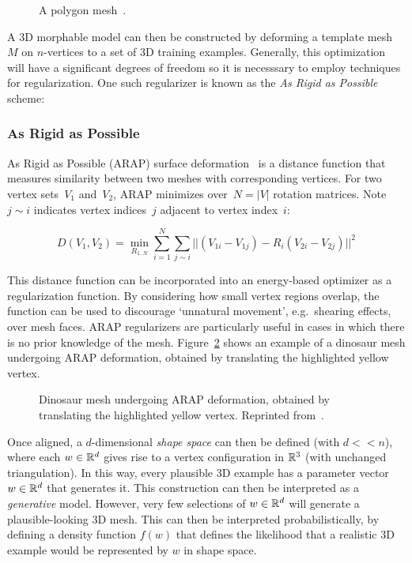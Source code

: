 \begin{figure}[H] %
    \caption{A polygon mesh~\cite{polygon_mesh}.}
    \label{fig:polygon_mesh}
\end{figure}

A 3D morphable model can then be constructed by deforming a template mesh $M$ on $n$-vertices to a set of 3D training examples. Generally, this optimization will have a significant degrees of freedom so it is necesssary to employ techniques for regularization. One such regularizer is known as the \emph{As Rigid as Possible} scheme: 

\subsubsection{As Rigid as Possible}
As Rigid as Possible (ARAP) surface deformation~\cite{sorkine2007rigid} is a distance function that measures similarity between two meshes with corresponding vertices. For two vertex sets~$V_{1}$ and~$V_{2}$, ARAP minimizes over~$N = |V|$ rotation matrices. Note~$j \sim i$ indicates vertex indices~$j$ adjacent to vertex index~$i$:

\begin{equation}
    D(V_{1}, V_{2}) = \min_{R_{1..N}}\sum_{i=1}^{N}\sum_{j \sim i}|| (V_{1i} - V_{1j}) - R_{i}(V_{2i} - V_{2j}) ||^{2}
\end{equation}

This distance function can be incorporated into an energy-based optimizer as a regularization function. By considering how small vertex regions overlap, the function can be used to  discourage `unnatural movement', e.g.\ shearing effects, over mesh faces. ARAP regularizers are particularly useful in cases in which there is no prior knowledge of the mesh. Figure~\ref{fig:arap_dino} shows an example of a dinosaur mesh undergoing ARAP deformation, obtained by translating the highlighted yellow vertex.

\begin{figure}[H] %
    \caption{Dinosaur mesh undergoing ARAP deformation, obtained by translating the highlighted yellow vertex. Reprinted from~\cite{sorkine2007rigid}.}
    \label{fig:arap_dino}
\end{figure}      

Once aligned, a $d$-dimensional \emph{shape space} can then be defined (with $d << n$), where each $w \in {\mathbb{R}^{d}}$ gives rise to a vertex configuration in ${\mathbb{R}^{3}}$ (with unchanged triangulation). In this way, every plausible 3D example has a parameter vector $w \in {\mathbb{R}^{d}}$ that generates it. This construction can then be interpreted as a \emph{generative} model. However, very few selections of $w \in {\mathbb{R}^{d}}$ will generate a plausible-looking 3D mesh. This can then be interpreted probabilistically, by defining a density function $f(w)$ that defines the likelihood that a realistic 3D example would be represented by $w$ in shape space. 

